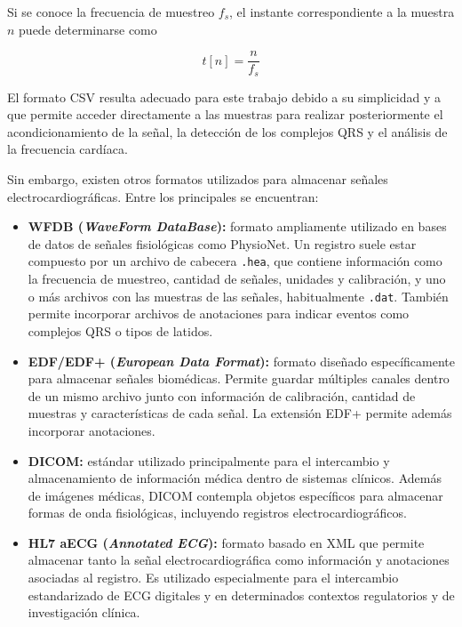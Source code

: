 \documentclass[12pt,a4paper]{article}
\begin{document}
Si se conoce la frecuencia de muestreo $f_s$, el instante correspondiente a la
muestra $n$ puede determinarse como

\[
t[n] = \frac{n}{f_s}
\]

El formato CSV resulta adecuado para este trabajo debido a su simplicidad y a que
permite acceder directamente a las muestras para realizar posteriormente el
acondicionamiento de la señal, la detección de los complejos QRS y el análisis de
la frecuencia cardíaca.

Sin embargo, existen otros formatos utilizados para almacenar señales
electrocardiográficas. Entre los principales se encuentran:

\begin{itemize}
    \item \textbf{WFDB (\textit{WaveForm DataBase}):} formato ampliamente
    utilizado en bases de datos de señales fisiológicas como PhysioNet. Un
    registro suele estar compuesto por un archivo de cabecera \texttt{.hea}, que
    contiene información como la frecuencia de muestreo, cantidad de señales,
    unidades y calibración, y uno o más archivos con las muestras de las señales,
    habitualmente \texttt{.dat}. También permite incorporar archivos de
    anotaciones para indicar eventos como complejos QRS o tipos de latidos.

    \item \textbf{EDF/EDF+ (\textit{European Data Format}):} formato diseñado
    específicamente para almacenar señales biomédicas. Permite guardar múltiples
    canales dentro de un mismo archivo junto con información de calibración,
    cantidad de muestras y características de cada señal. La extensión EDF+
    permite además incorporar anotaciones.

    \item \textbf{DICOM:} estándar utilizado principalmente para el intercambio
    y almacenamiento de información médica dentro de sistemas clínicos. Además
    de imágenes médicas, DICOM contempla objetos específicos para almacenar
    formas de onda fisiológicas, incluyendo registros electrocardiográficos.

    \item \textbf{HL7 aECG (\textit{Annotated ECG}):} formato basado en XML que
    permite almacenar tanto la señal electrocardiográfica como información y
    anotaciones asociadas al registro. Es utilizado especialmente para el
    intercambio estandarizado de ECG digitales y en determinados contextos
    regulatorios y de investigación clínica.
\end{itemize}
\end{document}
